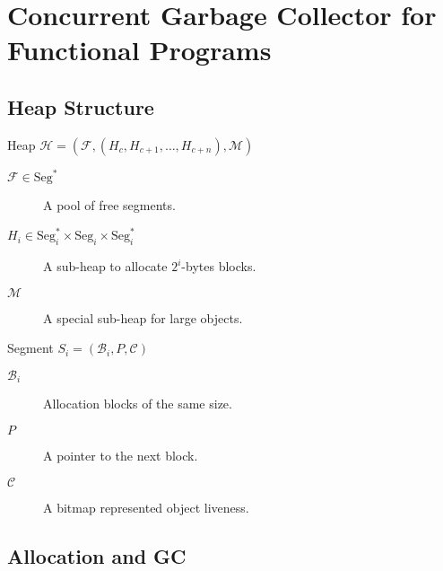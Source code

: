 \section{Concurrent Garbage Collector for Functional Programs}

\cite{Ueno:2011}\cite{Ueno:2016}\cite{Gamari:2020}

\subsection{Heap Structure}

Heap $\mathcal{H} = (\mathcal{F}, (H_c, H_{c + 1}, \ldots, H_{c + n}), \mathcal{M})$
\begin{description}
  \item[$\mathcal{F} \in \mathrm{Seg}^*$] A pool of free segments.
  \item[$H_i \in \mathrm{Seg}_i^* \times \mathrm{Seg}_i \times \mathrm{Seg}_i^*$] A sub-heap to allocate $2^i$-bytes blocks.
  \item[$\mathcal{M}$] A special sub-heap for large objects.
\end{description}

Segment $S_i = (\mathcal{B}_i, P, \mathcal{C})$
\begin{description}
  \item[$\mathcal{B}_i$] Allocation blocks of the same size.
  \item[$P$] A pointer to the next block.
  \item[$\mathcal{C}$] A bitmap represented object liveness.
\end{description}

\subsection{Allocation and GC}
